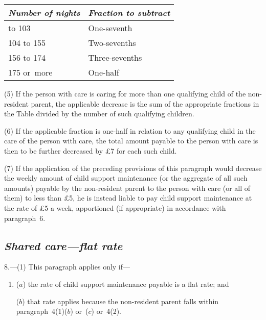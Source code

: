 \documentclass[12pt,a4paper]{article}
\begin{document}
{\footnotesize\noindent
\begin{longtable}{ll}
\hline
\itshape Number of nights	& \itshape Fraction to subtract\\
\hline
\endhead
\hline
\endlastfoot
52 to 103	&One-seventh\\
104 to 155	&Two-sevenths\\
156 to 174	&Three-sevenths\\
175 or~more	&One-half\\
\end{longtable}

}

\medskip

(5) If the person with care is caring for more than one qualifying child of the non-resident parent, the applicable decrease is the sum of the appropriate fractions in the Table divided by the number of such qualifying children.

(6) If the applicable fraction is one-half in relation to any qualifying child in the care of the person with care, the total amount payable to the person with care is then to be further decreased by £7 for each such child.

(7) If the application of the preceding provisions of this paragraph would decrease the weekly amount of child support maintenance (or the aggregate of all such amounts) payable by the non-resident parent to the person with care (or all of them) to less than £5, he is instead liable to pay child support maintenance at the rate of £5 a week, apportioned (if appropriate) in accordance with paragraph~6. 


\subsection*{\itshape Shared care—flat rate}

8.---(1) This paragraph applies only if—
\begin{enumerate}\item[]
($a$) the rate of child support maintenance payable is a flat rate; and

($b$) that rate applies because the non-resident parent falls within paragraph~4(1)($b$)  or~($c$)  or~4(2).
\end{enumerate}
\end{document}

